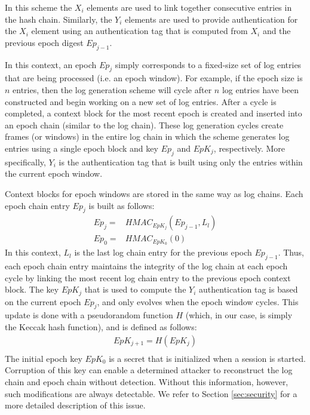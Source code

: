 \documentclass{sig-alternate}
\begin{document}
In this scheme the $X_i$ elements are used to link together consecutive entries in 
the hash chain. Similarly, the $Y_i$ elements are used to provide authentication 
for the $X_i$ element using an authentication tag that is computed from $X_i$ and the 
previous epoch digest $Ep_{j - 1}$. 

In this context, an epoch $Ep_j$ simply corresponds to a fixed-size set of log entries that
are being processed (i.e. an epoch window). For example, if the epoch size is $n$ entries, then the 
log generation scheme will cycle after $n$ log entries have been constructed and begin working on a new set of log entries. After a cycle is completed, a context block
for the most recent epoch is created and inserted into an epoch chain (similar to the log chain). These log generation cycles create frames (or windows) in the entire log chain in which the 
scheme generates log entries using a single epoch block and key $Ep_{j}$ and $EpK_j$, respectively. 
More specifically, $Y_i$ is the authentication tag that is built using only the entries within the current epoch window.



Context blocks for epoch windows are stored in the same way as log chains.
Each epoch chain entry $Ep_j$ is built as follows:
\begin{align*}
Ep_j = & HMAC_{EpK_{j}}(Ep_{j - 1}, L_{l}) \\
Ep_0 = & HMAC_{EpK_{0}}(0)
\end{align*}
In this context, $L_{l}$ is the last log chain entry for the previous epoch $Ep_{j - 1}$.
Thus, each epoch chain entry maintains the integrity of the log chain at each epoch cycle
by linking the most recent log chain entry to the previous epoch context block.
The key $EpK_{j}$ that is used to compute the $Y_i$ authentication tag is
based on the current epoch $Ep_j$, and only evolves when the epoch window cycles. 
This update is done with a pseudorandom function $H$ (which,
in our case, is simply the Keccak hash function), and is defined as follows:
\begin{align*}
EpK_{j + 1} = H(EpK_{j}) \\
\end{align*}
The initial epoch key $EpK_0$ is a secret that is initialized when a session
is started. Corruption of this key can enable a determined attacker to reconstruct
the log chain and epoch chain without detection. Without this information, however,
such modifications are always detectable. We refer to Section \ref{sec:security} for
a more detailed description of this issue.
\end{document}
